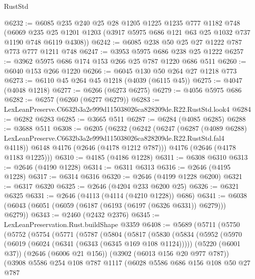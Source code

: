 \begin{lexlean}{RustStd}
\begin{coremodule}
@6232 := @6085
    @235
    @240
    @25
    @28
    @1205
    @1225
    @1235
    @777
    @1182
    @748
    (@6069 @235 @25 @1201 @1203 (@3917 @5975 @686 @121 @63 @25 @1032 @737 @1190 @748 @6119 @4308))
@6242 := @6085 @238 @50 @25 @27 @1222 @787 @773 @777 @1211 @748
@6247 := @3953 @5975 @686 @238 @25 @1222
@6257 := @3962 @5975 @686 @174 @153 @266 @25 @787 @1220 @686 @511
@6260 := @6040 @153 @266 @1220
@6266 := @6045 @130 @50 @264 @27 @1218 @773
@6273 := @6110 @45 @264 @45 @1218 (@4039 (@6115 @45))
@6275 := @4047 (@4048 @1218)
@6277 := @6266 (@6273 @6275)
@6279 := @4056 @5975 @686
@6282 := @6257 (@6260 (@6277 @6279))
@6283 := LexLeanPreserve.C6632b3a2e999d115038026ca828209de.R22.RustStd.look4
@6284 := @6282 @6283
@6285 := @3665 @511
@6287 := @6284 (@4085 @6285)
@6288 := @3688 @511
@6308 := @6205
    (@6232
      (@6242
        (@6247
          (@6287
            (@4089 @6288)
            LexLeanPreserve.C6632b3a2e999d115038026ca828209de.R22.RustStd.fal4
            @4118))
        @6148
        @4176
        (@2646 (@4178 @1212 @787)))
      @4176
      (@2646 (@4178 @1183 @1225)))
@6310 := @4185 (@4186 @1228)
@6311 := @6308 @6310
@6313 := @2646 (@4190 @1228)
@6314 := @6311 @6313
@6316 := @2646 (@4195 @1228)
@6317 := @6314 @6316
@6320 := @2646 (@4199 @1228 @6200)
@6321 := @6317 @6320
@6325 := @2646 (@4204 @233 @6200 @25)
@6326 := @6321 @6325
@6331 := @2646 (@4113 (@4114 (@4210 @1228)) @686)
@6341 := @6038 (@6043 (@6051 (@6059 (@6187 (@6193 (@6197 (@6326 @6331)) @6279))) @6279))
@6343 := @2460 (@2432 @2376)
@6345 := LexLeanPreservation.Rust.buildShape @3359
@6408 := @5689
    (@5711
      (@5750
        (@5752
          (@5754
            (@5771
              (@5787
                (@5804
                  (@5817
                    (@5830
                      (@5834
                        (@5952
                          (@5970
                            (@6019 (@6024 (@6341 (@6343 (@6345 @169 @108 @1124)))))
                            (@5220 (@6001 @37))
                            (@2646 (@6006 @21 @156))
                            (@3902 (@6013 @156 @20 @977 @787))
                            (@3908
                              @5586
                              @254
                              @108
                              @787
                              @1117
                              (@6028
                                @5586
                                @686
                                @156
                                @108
                                @50
                                @27
                                @787

\end{coremodule}
\end{lexlean}
